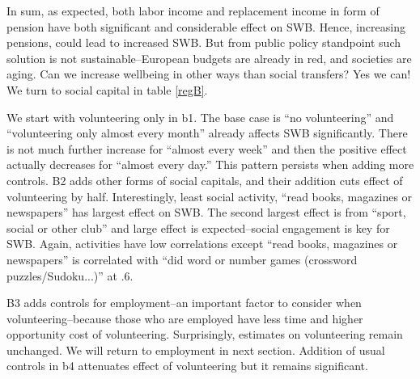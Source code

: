 \documentclass[10pt, letterpaper]{article}
\begin{document}
\begin{spacing}{1.4}
In sum, as expected, both labor income and replacement income in form of pension
have both significant and considerable effect on SWB. Hence, increasing
pensions, could lead to increased SWB. But from public policy standpoint such
solution is not sustainable--European budgets are already in red,  and societies are
aging. Can we increase wellbeing in other ways than social transfers? Yes we
can! We turn to social capital in table \ref{regB}.

We start with  volunteering only in b1. The base case is ``no volunteering'' and
 ``volunteering only almost every month'' already affects SWB significantly. There is not
much further increase for ``almost every week'' and then the positive effect actually decreases for ``almost
every day.'' This pattern persists when adding more controls. B2 adds other forms
of social capitals, and their addition cuts effect of volunteering by half.
%
 Interestingly, least social activity,  ``read books, magazines or newspapers'' has 
largest effect on SWB. The second largest effect is from ``sport, social or other
club'' and large effect is
expected--social engagement is key for SWB. Again, activities have low
correlations except ``read books, magazines or newspapers'' is
correlated with ``did word or number games (crossword puzzles/Sudoku...)'' at
.6.



B3 adds  controls for employment--an important factor to consider when
volunteering--because those who are employed have less time and higher
opportunity cost of volunteering. Surprisingly, estimates on volunteering remain
unchanged. We will return to employment in next section.
Addition of usual controls in b4 attenuates effect of volunteering but it
remains significant.
 





\end{spacing}
\end{document}
